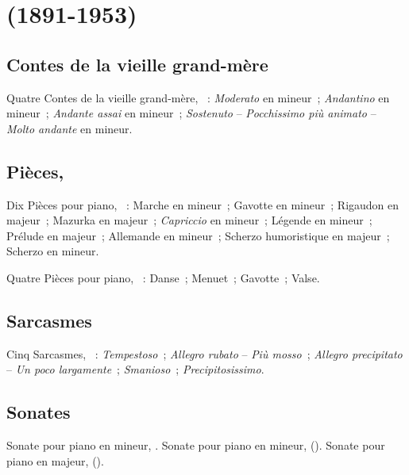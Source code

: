 \section[%
Sergej Prokof'ev (1891-1953)]{%
\SProkofiev{} (1891-1953)}

\subsection{Contes de la vieille grand-mère}

Quatre Contes de la vieille grand-mère, ~: 
\emph{Moderato} en \kD mineur~;  \emph{Andantino} en \kF \Sharp
mineur~;  \emph{Andante assai} en \kE mineur~; 
\emph{Sostenuto} -- \emph{Pocchissimo più animato} -- \emph{Molto andante}
en \kB mineur.

\subsection{Pièces, }

Dix Pièces pour piano, ~:  Marche en \kF \Sharp mineur~;
 Gavotte en \kG mineur~;  Rigaudon en \kC majeur~;
 Mazurka en \kB majeur~;  \emph{Capriccio} en \kE
mineur~;  Légende en \kD mineur~;  Prélude en \kC
majeur~;  Allemande en \kF \Sharp mineur~;  Scherzo
humoristique en \kC majeur~;  Scherzo en \kA mineur.

Quatre Pièces pour piano, ~:  Danse~;  Menuet~;
 Gavotte~;  Valse.

\subsection{Sarcasmes}

Cinq Sarcasmes, ~:  \emph{Tempestoso}~; 
\emph{Allegro rubato} -- \emph{Più mosso}~;  \emph{Allegro
precipitato} -- \emph{Un poco largamente}~;  \emph{Smanioso}~;
 \emph{Precipitosissimo}.

\subsection{Sonates}

Sonate pour piano  en \kD mineur, .
Sonate pour piano  en \kA mineur,  ().
Sonate pour piano  en \kB \Flat majeur, 
().

